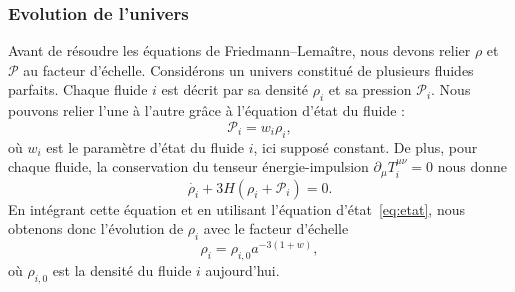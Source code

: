 \documentclass[11pt, twoside, a4paper, openright]{report}
\begin{document}
\subsubsection{Evolution de l'univers}
Avant de résoudre les équations de Friedmann–Lemaître, nous devons relier $\rho$ et $\mathcal{P}$ au facteur d'échelle. Considérons un univers constitué de plusieurs fluides parfaits. Chaque fluide $i$ est décrit par sa densité $\rho_i$ et sa pression $\mathcal{P}_i$. Nous pouvons relier l'une à l'autre grâce à l'équation d'état du fluide :
\begin{equation}
  \label{eq:etat}
  \mathcal{P}_i = w_i \rho_i,
\end{equation}
où $w_i$ est le paramètre d'état du fluide $i$, ici supposé constant.
De plus, pour chaque fluide, la conservation du tenseur énergie-impulsion $\partial_{\mu} T_i^{\mu \nu} = 0$ nous donne
\begin{equation}
  \label{eq:conservation}
  \dot{\rho_i} + 3 H (\rho_i + \mathcal{P}_i) = 0 .
\end{equation}
En intégrant cette équation et en utilisant l'équation d'état~\ref{eq:etat}, nous obtenons donc l'évolution de $\rho_i$ avec le facteur d'échelle
\begin{equation}
  \label{eq:rho_vs_a}
  \rho_i = \rho_{i,0} a^{-3(1+w)} ,
\end{equation}
où $\rho_{i,0}$ est la densité du fluide $i$ aujourd'hui.
\end{document}
